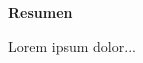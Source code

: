 \thispagestyle{plain}
\begin{center}
	\Large    
	\vspace{0.9cm}
	\textbf{Resumen}
\end{center}
Lorem ipsum dolor...